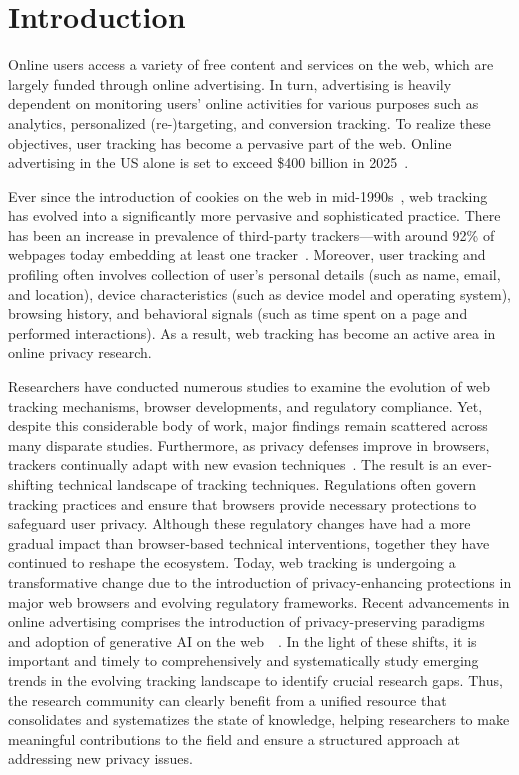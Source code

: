 \section{Introduction}
\label{sec:introduction}
\vspace{-3mm}

Online users access a variety of free content and services on the web, which are largely funded through online advertising.
%
In turn, advertising is heavily dependent on monitoring users' online activities for various purposes 
%
such as analytics, personalized (re-)targeting, and conversion tracking.
%
To realize these objectives, user tracking has become a pervasive part of the web.
%
Online advertising in the US alone is set to exceed \$400 billion in 2025~\cite{adSpendEmarketer2025}.

Ever since the introduction of cookies on the web in mid-1990s~\cite{cookieIntroduction}, web tracking has evolved into a significantly more pervasive  and sophisticated practice.
%
There has been an increase in prevalence of third-party trackers---with around 92\% of webpages today embedding at least one tracker~\cite{urban2024WebAlmanac2024}.
%
Moreover, user tracking and profiling often involves collection of user's personal details (such as name, email, and location), device characteristics (such as device model and operating system), browsing history, and behavioral signals (such as time spent on a page and performed interactions).
%
As a result, web tracking has become an active area in online privacy research.


Researchers have conducted numerous studies to examine the evolution of web tracking mechanisms, browser developments, and regulatory compliance. 
%
Yet, despite this considerable body of work, major findings remain scattered across many disparate studies.
%
Furthermore, as privacy defenses improve in browsers, trackers continually adapt with new evasion techniques~\cite{narayanan2018web}.
%
The result is an ever-shifting technical landscape of tracking techniques.
%
Regulations often govern tracking practices and ensure that browsers provide necessary protections to safeguard user privacy.
%
Although these regulatory changes have had a more gradual impact than browser-based technical interventions, together they have continued to reshape the ecosystem. 
%
Today, web tracking is undergoing a transformative change due to the introduction of privacy-enhancing  protections in major web browsers and evolving regulatory frameworks.
%
Recent advancements in online advertising comprises the introduction of privacy-preserving paradigms~\cite{privacySandbox} and adoption of generative AI on the web~\cite{perplexity2025, operator2025, builtin-ai}~\cite{chavezNewPathPrivacy2024}.
%
In the light of these shifts, it is important and timely to comprehensively and systematically study emerging trends in the evolving tracking landscape to identify crucial research gaps.
%
Thus, the research community can clearly benefit from a unified resource that consolidates and systematizes the state of knowledge, helping researchers to make meaningful contributions to the field and ensure a structured approach at addressing new privacy issues.

